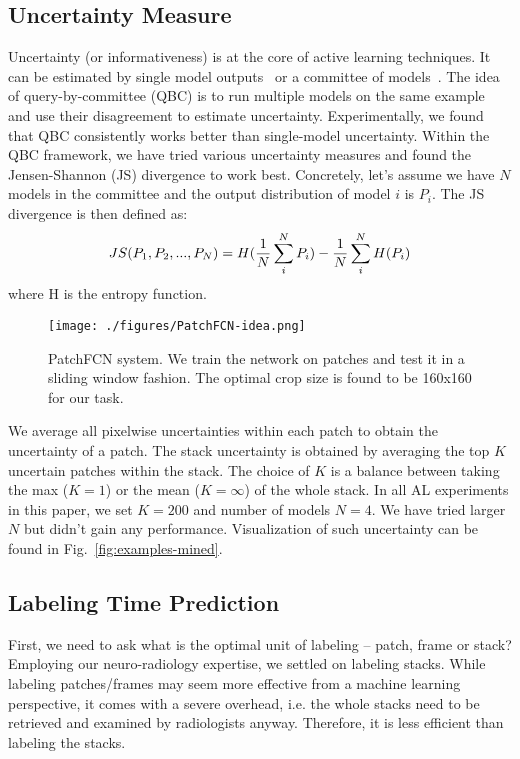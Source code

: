 \documentclass{llncs}
\begin{document}
\subsection{Uncertainty Measure}
\label{sec:uncertainty}
\vspace*{-0.05cm}
Uncertainty (or informativeness) is at the core of active learning techniques. It can be estimated by single model outputs~\cite{lewis1994sequential} or a committee of models~\cite{seung1992query}. The idea of query-by-committee (QBC) is to run multiple models on the same example and use their disagreement to estimate uncertainty. Experimentally, we found that QBC consistently works better than single-model uncertainty.
Within the QBC framework, we have tried various uncertainty measures and found the 
Jensen-Shannon (JS) divergence to work best. Concretely, let's assume we have $N$ models in the committee and the output distribution of model $i$ is $P_i$. The JS divergence is then defined as: 
\vspace*{-0.3cm}
\begin{equation}
  JS(P_1,P_2,...,P_N) = H(\frac{1}{N}\sum_i^{N}P_i) - \frac{1}{N}\sum_i^{N}H(P_i)
\vspace*{-0.3cm}
\end{equation}
where H is the entropy function.

\begin{figure}[t]
    \centering
    \texttt{[image: ./figures/PatchFCN-idea.png]}
    \vspace*{-0.3cm}
    \caption{PatchFCN system. We train the network on patches and test it in a sliding window fashion. The optimal crop size is found to be 160x160 for our task. %
    }
    \vspace*{-0.2cm}
    \label{fig:patch-fcn}
\end{figure}

We average all pixelwise uncertainties within each patch to obtain the uncertainty of a patch. The stack uncertainty is obtained by averaging the top $K$ uncertain patches within the stack. The choice of $K$ is a balance between taking the max ($K=1$) or the mean ($K=\infty$) of the whole stack. In all AL experiments in this paper, we set $K=200$ and number of models $N=4$. We have tried larger $N$ but didn't gain any performance. Visualization of such uncertainty can be found in Fig.~\ref{fig:examples-mined}.


\subsection{Labeling Time Prediction}
\vspace*{-0.05cm}
\label{sect:predtime}
First, we need to ask what is the optimal unit of labeling -- patch, frame or stack? Employing our neuro-radiology expertise, we settled on labeling stacks. While labeling patches/frames may seem more effective from a machine learning perspective, it comes with a severe overhead, i.e. the whole stacks need to be retrieved and examined by radiologists anyway. Therefore, it is less efficient than labeling the stacks.
\end{document}
